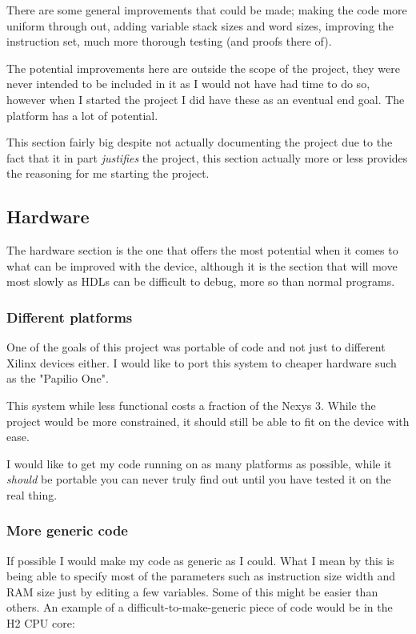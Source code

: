 \documentclass	[a4paper, 10pt]	{article}
\newcommand{\findcite}[1]{
  \par
  \begin{center}
  \framebox[\textwidth]{
    \textcolor{red}{\emph{Find Citation on:} \textsc{#1}}
  }
  \end{center}
  \par
}
\begin{document}
    There are some general improvements that could be made; making the code more uniform
    through out, adding variable stack sizes and word sizes, improving the instruction set,
    much more thorough testing (and proofs there of).

    The potential improvements here are outside the scope of the project, they were never
    intended to be included in it as I would not have had time to do so, however when I
    started the project I did have these as an eventual end goal. The platform has a lot of
    potential.

    This section fairly big despite not actually documenting the project due to the fact
    that it in part \emph{justifies} the project, this section actually more or less provides
    the reasoning for me starting the project.

    \subsection{Hardware}

      The hardware section is the one that offers the most potential when it comes to
      what can be improved with the device, although it is the section that will move
      most slowly as HDLs can be difficult to debug, more so than normal programs.

      \subsubsection{Different platforms}
      One of the goals of this project was portable of code and not just to different
      Xilinx devices either. I would like to port this system to cheaper hardware
      such as the "Papilio One". \findcite{http://papilio.cc/} This system while less
      functional costs a fraction of the Nexys 3. While the project would be more
      constrained, it should still be able to fit on the device with ease.

      I would like to get my code running on as many platforms as possible, while it
      \emph{should} be portable you can never truly find out until you have tested
      it on the real thing.

      \subsubsection{More generic code}

        If possible I would make my code as generic as I could. What I mean by this
        is being able to specify most of the parameters such as instruction size
        width and RAM size just by editing a few variables. Some of this might be
        easier than others. An example of a difficult-to-make-generic piece of code
        would be in the H2 CPU core:
\end{document}
